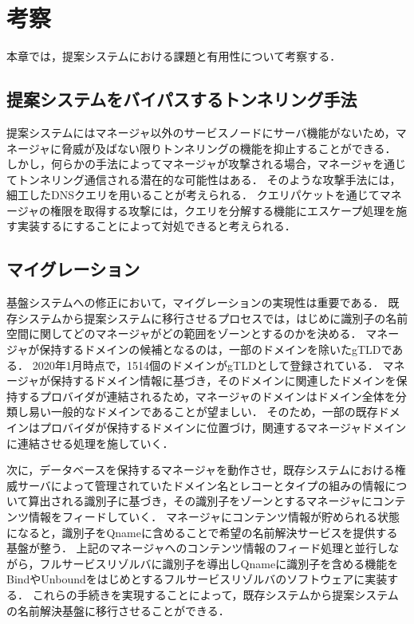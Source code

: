 \section{考察}
本章では，提案システムにおける課題と有用性について考察する．

\subsection{提案システムをバイパスするトンネリング手法}
提案システムにはマネージャ以外のサービスノードにサーバ機能がないため，マネージャに脅威が及ばない限りトンネリングの機能を抑止することができる．
しかし，何らかの手法によってマネージャが攻撃される場合，マネージャを通じてトンネリング通信される潜在的な可能性はある．
そのような攻撃手法には，細工したDNSクエリを用いることが考えられる．
クエリパケットを通じてマネージャの権限を取得する攻撃には，クエリを分解する機能にエスケープ処理を施す実装するにすることによって対処できると考えられる．

\subsection{マイグレーション}
基盤システムへの修正において，マイグレーションの実現性は重要である．
既存システムから提案システムに移行させるプロセスでは，はじめに識別子の名前空間に関してどのマネージャがどの範囲をゾーンとするのかを決める．
マネージャが保持するドメインの候補となるのは，一部のドメインを除いたgTLDである．
2020年1月時点で，1514個のドメインがgTLDとして登録されている．
マネージャが保持するドメイン情報に基づき，そのドメインに関連したドメインを保持するプロバイダが連結されるため，マネージャのドメインはドメイン全体を分類し易い一般的なドメインであることが望ましい．
そのため，一部の既存ドメインはプロバイダが保持するドメインに位置づけ，関連するマネージャドメインに連結させる処理を施していく．

次に，データベースを保持するマネージャを動作させ，既存システムにおける権威サーバによって管理されていたドメイン名とレコーとタイプの組みの情報について算出される識別子に基づき，その識別子をゾーンとするマネージャにコンテンツ情報をフィードしていく．
マネージャにコンテンツ情報が貯められる状態になると，識別子をQnameに含めることで希望の名前解決サービスを提供する基盤が整う．
上記のマネージャへのコンテンツ情報のフィード処理と並行しながら，フルサービスリゾルバに識別子を導出しQnameに識別子を含める機能をBindやUnboundをはじめとするフルサービスリゾルバのソフトウェアに実装する．
これらの手続きを実現することによって，既存システムから提案システムの名前解決基盤に移行させることができる．


